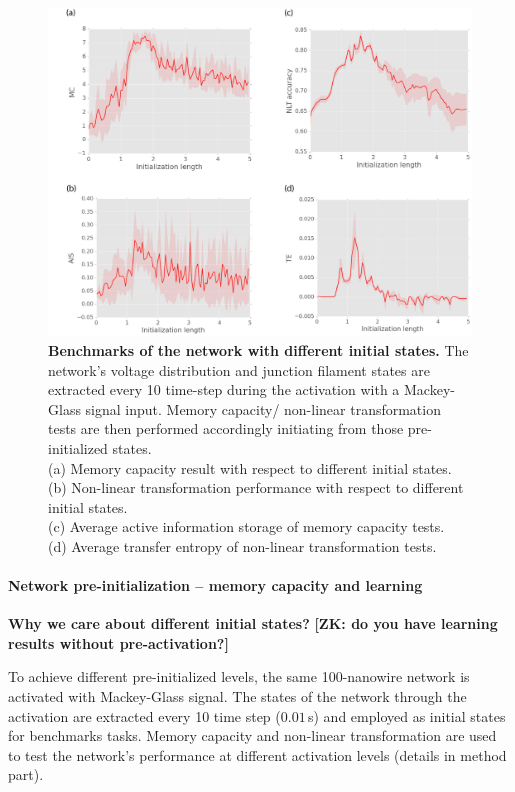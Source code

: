 \documentclass[fleqn,10pt,  reprint, amsmath,amssymb,aps, floatfix]{wlscirep}
\begin{document}
\begin{figure}[]
	\centering
	\includegraphics[width=1\linewidth]{figure/benchmark.png}
	\caption{\textbf{Benchmarks of the network with different initial states.} The network's voltage distribution and junction filament states are extracted every 10 time-step during the activation with a Mackey-Glass signal input. Memory capacity/ non-linear transformation tests are then performed accordingly initiating from those pre-initialized states. \\
	(a) Memory capacity result with respect to different initial states.\\
	(b) Non-linear transformation performance with respect to different initial states.\\
	(c) Average active information storage of memory capacity tests.\\
	(d) Average transfer entropy of non-linear transformation tests.} 
	\label{fig:benchmark}
\end{figure}

\paragraph{Network pre-initialization -- memory capacity and learning}

\textbf{Why we care about different initial states?} 
\textbf{[ZK: do you have learning results without pre-activation?]}


To achieve different pre-initialized levels, the same 100-nanowire network is activated with Mackey-Glass signal. The states of the network through the activation are extracted every 10 time step ($0.01 \,$s) and employed as initial states for benchmarks tasks. Memory capacity and non-linear transformation are used to test the network's performance at different activation levels (details in method part). 
\end{document}
